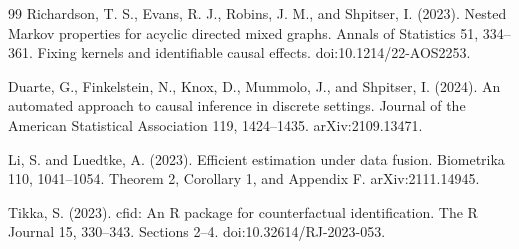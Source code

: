 \documentclass{article}
\begin{document}
\begin{thebibliography}{99}
   Richardson, T. S., Evans, R. J., Robins, J. M., and Shpitser, I. (2023). Nested Markov properties for acyclic directed mixed graphs. Annals of Statistics 51, 334--361. Fixing kernels and identifiable causal effects. doi:10.1214/22-AOS2253.

   Duarte, G., Finkelstein, N., Knox, D., Mummolo, J., and Shpitser, I. (2024). An automated approach to causal inference in discrete settings. Journal of the American Statistical Association 119, 1424--1435. arXiv:2109.13471.

   Li, S. and Luedtke, A. (2023). Efficient estimation under data fusion. Biometrika 110, 1041--1054. Theorem 2, Corollary 1, and Appendix F. arXiv:2111.14945.

   Tikka, S. (2023). cfid: An R package for counterfactual identification. The R Journal 15, 330--343. Sections 2--4. doi:10.32614/RJ-2023-053.

\end{thebibliography}
\end{document}
